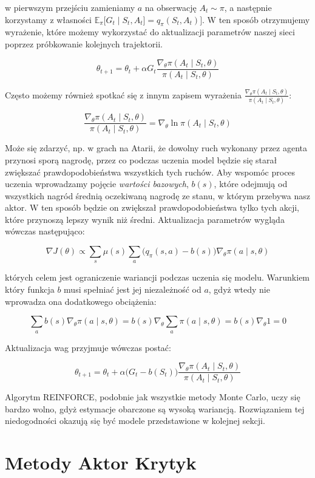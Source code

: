 \documentclass[licencjacka]{pracamgr}
\begin{document}
w pierwszym przejściu zamieniamy $a$ na obserwację $A_t \sim \pi$, a następnie korzystamy z własności $ \mathbb{E}_\pi \big[ G_t \mid S_t, A_t \big] = q_\pi(S_t, A_t) \big] $. W ten sposób otrzymujemy wyrażenie, które możemy wykorzystać do aktualizacji parametrów naszej sieci poprzez próbkowanie kolejnych trajektorii.

$$ \theta_{t+1} = \theta_t + \alpha G_t \frac{\nabla_\theta \pi(A_t \mid S_t, \theta)}{\pi(A_t \mid S_t, \theta)} $$

Często możemy również spotkać się z innym zapisem wyrażenia $  \frac{\nabla_\theta \pi(A_t \mid S_t, \theta)}{\pi(A_t \mid S_t, \theta)}$:

$$  \frac{\nabla_\theta \pi(A_t \mid S_t, \theta)}{\pi(A_t \mid S_t, \theta)} = \nabla_\theta \ln \pi(A_t \mid S_t, \theta) $$

Może się zdarzyć, np. w grach na Atarii, że dowolny ruch wykonany przez agenta przynosi sporą nagrodę, przez co podczas uczenia model będzie się starał zwiększać prawdopodobieństwa wszystkich tych ruchów. Aby wspomóc proces uczenia wprowadzamy pojęcie \emph{wartości bazowych}, $b(s)$, które odejmują od wszystkich nagród średnią oczekiwaną nagrodę ze stanu, w którym przebywa nasz aktor. W ten sposób będzie on zwiększał prawdopodobieństwa tylko tych akcji, które przynoszą lepszy wynik niż średni. Aktualizacja parametrów wygląda wówczas następująco:

$$ \nabla J(\theta) \propto \sum_s \mu(s) \sum_a \Big( q_\pi(s, a) - b(s) \Big) \nabla_\theta \pi(a \mid s, \theta) $$

których celem jest ograniczenie wariancji podczas uczenia się modelu. Warunkiem który funkcja $b$ musi spełniać jest jej niezależność od $a$, gdyż wtedy nie wprowadza ona dodatkowego obciążenia:

$$ \sum_a b(s) \nabla_\theta \pi(a \mid s, \theta) = b(s) \nabla_\theta \sum_a \pi(a \mid s, \theta) = b(s) \nabla_\theta 1 = 0 $$

Aktualizacja wag przyjmuje wówczas postać:

$$ \theta_{t+1} = \theta_t + \alpha \Big( G_t - b(S_t) \Big) \frac{\nabla_\theta \pi(A_t \mid S_t, \theta)}{\pi(A_t \mid S_t, \theta)} $$


Algorytm REINFORCE, podobnie jak wszystkie metody Monte Carlo, uczy się bardzo wolno, gdyż estymacje obarczone są wysoką wariancją. Rozwiązaniem tej niedogodności okazują się być modele przedstawione w kolejnej sekcji.

\section{Metody Aktor Krytyk}
\end{document}
